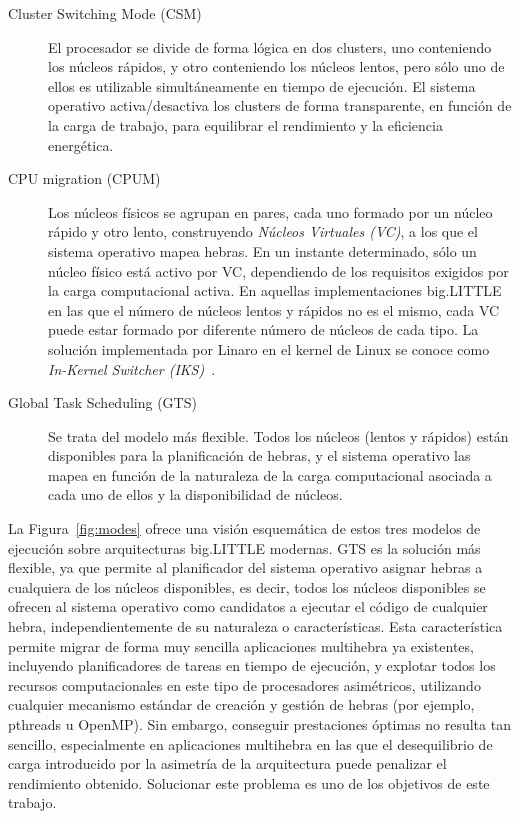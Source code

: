 \begin{description}

	\item[Cluster Switching Mode (CSM)]

El procesador se divide de forma lógica en dos clusters, uno conteniendo los núcleos
rápidos, y otro conteniendo los núcleos lentos, pero sólo uno de ellos es utilizable
simultáneamente en tiempo de ejecución. El sistema operativo activa/desactiva los 
clusters de forma transparente, en función de la carga de trabajo, para equilibrar
el rendimiento y la eficiencia energética.

	\item[CPU migration (CPUM)]

Los núcleos físicos se agrupan en pares, cada uno formado por un núcleo rápido y otro
lento, construyendo {\em Núcleos Virtuales (VC)}, a los que el sistema operativo mapea
hebras. En un instante determinado, sólo un núcleo físico está activo por VC, dependiendo
de los requisitos exigidos por la carga computacional activa. En aquellas implementaciones
big.LITTLE en las que el número de núcleos lentos y rápidos no es el mismo, cada VC puede
estar formado por diferente número de núcleos de cada tipo. La solución implementada
por Linaro en el kernel de Linux se conoce como {\em In-Kernel Switcher (IKS)}~\cite{}.

	\item[Global Task Scheduling (GTS)]

Se trata del modelo más flexible. Todos los núcleos (lentos y rápidos) están disponibles
para la planificación de hebras, y el sistema operativo las mapea en función de la naturaleza
de la carga computacional asociada a cada uno de ellos y la disponibilidad de núcleos. 

\end{description}

La Figura~\ref{fig:modes} ofrece una visión esquemática de estos tres modelos de ejecución
sobre arquitecturas big.LITTLE modernas. GTS es la solución más flexible, ya que permite al planificador
del sistema operativo asignar hebras a cualquiera de los núcleos disponibles, es decir, todos
los núcleos disponibles se ofrecen al sistema operativo como candidatos a ejecutar el código
de cualquier hebra, independientemente de su naturaleza o características. Esta característica
permite migrar de forma muy sencilla aplicaciones multihebra ya existentes, incluyendo planificadores
de tareas en tiempo de ejecución, y explotar todos los recursos computacionales en este tipo de 
procesadores asimétricos, utilizando cualquier mecanismo estándar de creación y gestión de hebras
(por ejemplo, pthreads u OpenMP). Sin embargo, conseguir prestaciones óptimas no resulta tan
sencillo, especialmente en aplicaciones multihebra en las que el desequilibrio de carga introducido
por la asimetría de la arquitectura puede penalizar el rendimiento obtenido. Solucionar este problema
es uno de los objetivos de este trabajo.

